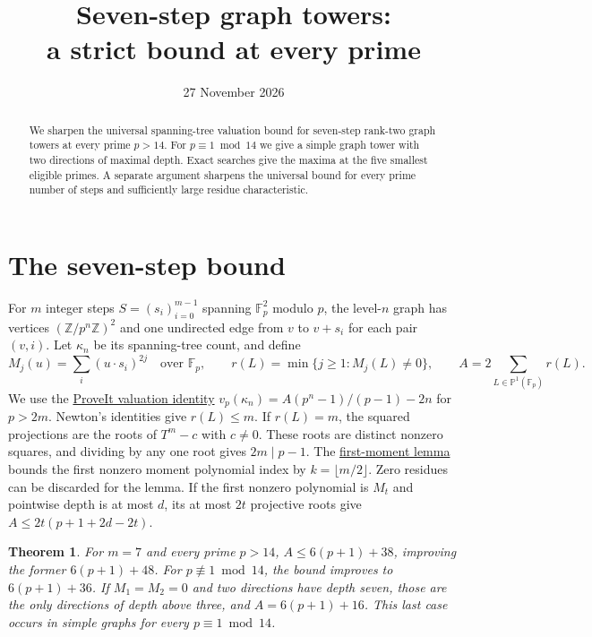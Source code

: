 \documentclass[11pt]{article}
\title{Seven-step graph towers:\\a strict bound at every prime}
\author{}
\date{27 November 2026}
\newtheorem{theorem}{Theorem}
\newcommand{\F}{\mathbb F}
\newcommand{\PP}{\mathbb P}
\begin{document}
\maketitle
\vspace{-2em}
\begin{abstract}
We sharpen the universal spanning-tree valuation bound for seven-step
rank-two graph towers at every prime $p>14$. For $p\equiv1\bmod14$ we
give a simple graph tower with two directions of maximal depth.
Exact searches give the maxima at the five smallest eligible primes.
A separate argument sharpens the universal bound for every prime
number of steps and sufficiently large residue characteristic.
\end{abstract}

\section{The seven-step bound}
For $m$ integer steps $S=(s_i)_{i=0}^{m-1}$ spanning $\F_p^2$ modulo $p$,
the level-$n$ graph has vertices $(\mathbb Z/p^n\mathbb Z)^2$ and
one undirected edge from $v$ to $v+s_i$ for each pair $(v,i)$.
Let $\kappa_n$ be its spanning-tree count, and define
\[
 M_j(u)=\sum_i(u\cdot s_i)^{2j}\quad\text{over }\F_p,\qquad
 r(L)=\min\{j\ge1:M_j(L)\ne0\},\qquad A=2\sum_{L\in\PP^1(\F_p)}r(L).
\]
We use the \href{https://github.com/VladimirReshetnikov/ProveIt/blob/21c0252ffe8611baa0fbf528fbb003d6c42ca9af/Analysis/GeneralizedRiemannHypothesis/Research/grh_transfers_lubin_tate_and_graph_towers/graphs.tex}{ProveIt valuation identity}
$v_p(\kappa_n)=A(p^n-1)/(p-1)-2n$ for $p>2m$. Newton's identities
give $r(L)\le m$. If $r(L)=m$, the squared projections are the
roots of $T^m-c$ with $c\ne0$. These roots are distinct nonzero
squares, and dividing by any one root gives $2m\mid p-1$.
The \href{https://github.com/VladimirReshetnikov/ProveIt/blob/21c0252ffe8611baa0fbf528fbb003d6c42ca9af/Analysis/GeneralizedRiemannHypothesis/Research/grh_transfer_extensions_2026-11-26/sections/graph_extremum.tex}{first-moment lemma}
bounds the first nonzero moment polynomial index by
$k=\lfloor m/2\rfloor$. Zero residues can be discarded for the lemma.
If the first nonzero polynomial is $M_t$ and pointwise depth is at
most $d$, its at most $2t$ projective roots give
$A\le2t(p+1+2d-2t)$.

\begin{theorem}
For $m=7$ and every prime $p>14$, $A\le6(p+1)+38$,
improving the former $6(p+1)+48$. For $p\not\equiv1\bmod14$,
the bound improves to $6(p+1)+36$.
If $M_1=M_2=0$ and two directions have depth seven, those are the
only directions of depth above three, and $A=6(p+1)+16$.
This last case occurs in simple graphs for every $p\equiv1\bmod14$.
\end{theorem}
\end{document}
